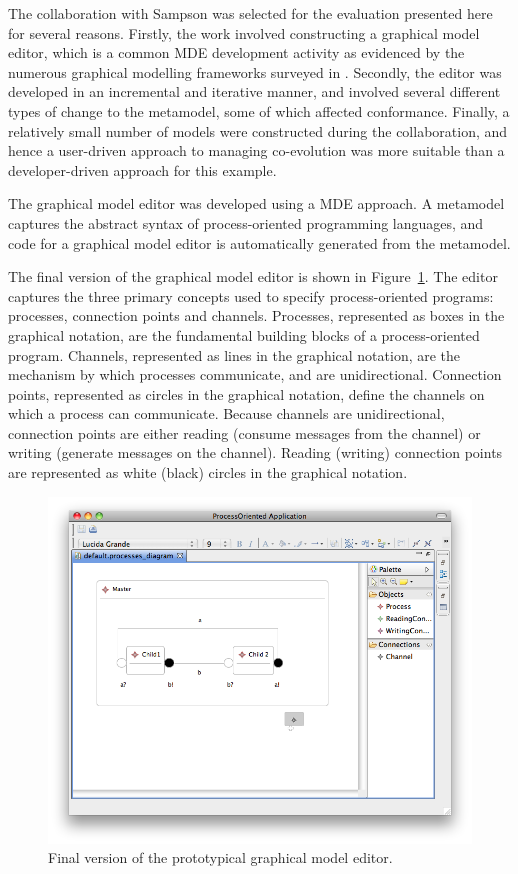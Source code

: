 The collaboration with Sampson was selected for the evaluation presented here for several reasons. Firstly, the work involved constructing a graphical model editor, which is a common MDE development activity as evidenced by the numerous graphical modelling frameworks surveyed in \cite{amyot06evaluation}. Secondly, the editor was developed in an incremental and iterative manner, and involved several different types of change to the metamodel, some of which affected conformance. Finally, a relatively small number of models were constructed during the collaboration, and hence a user-driven approach to managing co-evolution was more suitable than a developer-driven approach for this example.

The graphical model editor was developed using a MDE approach. A metamodel captures the abstract syntax of process-oriented programming languages, and code for a graphical model editor is automatically generated from the metamodel. 

The final version of the graphical model editor is shown in Figure~\ref{fig:po_final_graphical_editor}. The editor captures the three primary concepts used to specify process-oriented programs: processes, connection points and channels. Processes, represented as boxes in the graphical notation, are the fundamental building blocks of a process-oriented program. Channels, represented as lines in the graphical notation, are the mechanism by which processes communicate, and are unidirectional. Connection points, represented as circles in the graphical notation, define the channels on which a process can communicate. Because channels are unidirectional, connection points are either reading (consume messages from the channel) or writing (generate messages on the channel). Reading (writing) connection points are represented as white (black) circles in the graphical notation.  

\begin{figure}[htbp]
	\centering
	\includegraphics[width=13.5cm]{6.Evaluation/images/user_driven/po_final_editor.png}
	\caption{Final version of the prototypical graphical model editor.}
	\label{fig:po_final_graphical_editor}
\end{figure}


